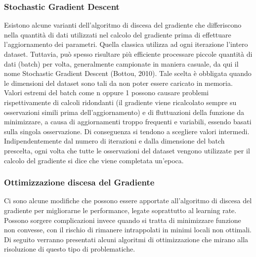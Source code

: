\subsubsection{Stochastic Gradient Descent}
Esistono alcune varianti dell'algoritmo di discesa del gradiente che differiscono nella quantità di dati utilizzati nel calcolo del gradiente prima di effettuare l'aggiornamento dei parametri. Quella classica utilizza ad ogni iterazione l'intero dataset. Tuttavia, può spesso risultare più efficiente processare piccole quantità di dati (batch) per volta, generalmente campionate in maniera casuale, da qui il nome Stochastic Gradient Descent (Bottou, 2010). Tale scelta è obbligata quando le dimensioni del dataset sono tali da non poter essere caricato in memoria. Valori estremi del batch come n oppure 1 possono causare problemi rispettivamente di calcoli ridondanti (il gradiente viene ricalcolato sempre su osservazioni simili prima dell'aggiornamento) e di fluttuazioni della funzione da minimizzare, a causa di aggiornamenti troppo frequenti e variabili, essendo basati sulla singola osservazione. Di conseguenza si tendono a scegliere valori intermedi. Indipendentemente dal numero di iterazioni e dalla dimensione del batch prescelta, ogni volta che tutte le osservazioni del dataset vengono utilizzate per il calcolo del gradiente si dice che viene completata un'epoca.

\subsubsection{Ottimizzazione discesa del Gradiente}
Ci sono alcune modifiche che possono essere apportate all'algoritmo di discesa del gradiente per migliorarne le performance, legate soprattutto al learning rate. Possono sorgere complicazioni invece quando si tratta di minimizzare funzione non convesse, con il rischio di rimanere intrappolati in minimi locali non ottimali. Di seguito verranno presentati alcuni algoritmi di ottimizzazione che mirano alla risoluzione di questo tipo di problematiche.

